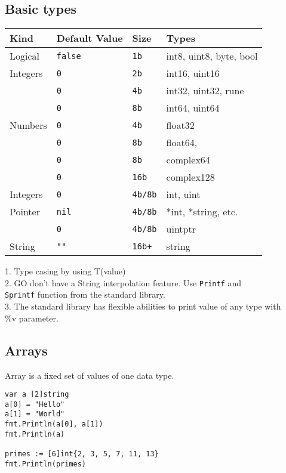 \documentclass[12pt]{article}
\begin{document}
\subsection*{Basic types}
\label{subsec:basic-types}
\begin{paracol}{2}
\begin{leftcolumn}
\begin{tabular}{llll}
\hline
Kind        & Default Value & Size    & Types       \\
\hline
Logical     & \texttt{false}& \texttt{1b}      & int8, uint8, byte, bool \\
Integers    & \texttt{0}    & \texttt{2b}      & int16, uint16 \\
            & \texttt{0}    & \texttt{4b}      & int32, uint32, rune\\
            & \texttt{0}    & \texttt{8b}      & int64, uint64\\
Numbers     & \texttt{0}    & \texttt{4b}      & float32 \\
            & \texttt{0}    & \texttt{8b}      & float64,  \\
            & \texttt{0}    & \texttt{8b}      & complex64  \\
            & \texttt{0}    & \texttt{16b}     & complex128 \\
Integers    & \texttt{0}    & \texttt{4b/8b}   & int, uint \\
Pointer     & \texttt{nil}  & \texttt{4b/8b}   & *int, *string, etc. \\
            & \texttt{0}    & \texttt{4b/8b}   & uintptr \\
String      & \texttt{""}   & \texttt{16b+}    & string \\
\hline
\end{tabular}
\end{leftcolumn}
\begin{rightcolumn}
1. Type casing by using T(value) \\
2. GO don't have a String interpolation feature. Use \texttt{Printf} and \\
\texttt{Sprintf} function from the standard library. \\
3. The standard library has flexible abilities to print value of any type with \\
\%v parameter.
\end{rightcolumn}
\end{paracol}

\subsection{Arrays}
Array is a fixed set of values of one data type.
\begin{lstlisting}
var a [2]string
a[0] = "Hello"
a[1] = "World"
fmt.Println(a[0], a[1])
fmt.Println(a)

primes := [6]int{2, 3, 5, 7, 11, 13}
fmt.Println(primes)
\end{lstlisting}
\end{document}
